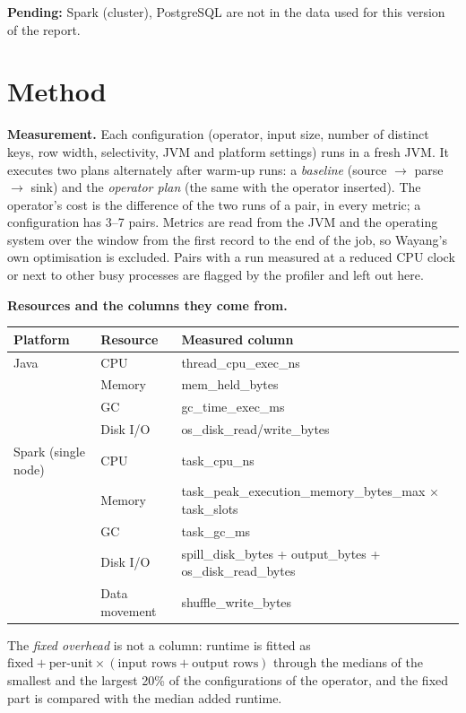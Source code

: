 \documentclass[11pt,a4paper]{article}
\begin{document}
\textbf{Pending:} Spark (cluster), PostgreSQL are not in the data used for this version of the report.
\section{Method}

\textbf{Measurement.} Each configuration (operator, input size, number of distinct keys, row width, selectivity, JVM and platform settings) runs in a fresh JVM. It executes two plans alternately after warm-up runs: a \emph{baseline} (source $\to$ parse $\to$ sink) and the \emph{operator plan} (the same with the operator inserted). The operator's cost is the difference of the two runs of a pair, in every metric; a configuration has 3--7 pairs. Metrics are read from the JVM and the operating system over the window from the first record to the end of the job, so Wayang's own optimisation is excluded. Pairs with a run measured at a reduced CPU clock or next to other busy processes are flagged by the profiler and left out here.

\textbf{Resources and the columns they come from.}
\begin{center}\small\begin{tabular}{@{}llp{9.2cm}@{}}\toprule

Platform & Resource & Measured column\\\midrule

Java & CPU & thread\_cpu\_exec\_ns\\
 & Memory & mem\_held\_bytes\\
 & GC & gc\_time\_exec\_ms\\
 & Disk I/O & os\_disk\_read/write\_bytes\\
\midrule

Spark (single node) & CPU & task\_cpu\_ns\\
 & Memory & task\_peak\_execution\_memory\_bytes\_max $\times$ task\_slots\\
 & GC & task\_gc\_ms\\
 & Disk I/O & spill\_disk\_bytes + output\_bytes + os\_disk\_read\_bytes\\
 & Data movement & shuffle\_write\_bytes\\
\midrule
\bottomrule\end{tabular}\end{center}

The \emph{fixed overhead} is not a column: runtime is fitted as $\text{fixed} + \text{per-unit}\times(\text{input rows}+\text{output rows})$ through the medians of the smallest and the largest 20\% of the configurations of the operator, and the fixed part is compared with the median added runtime.
\end{document}
